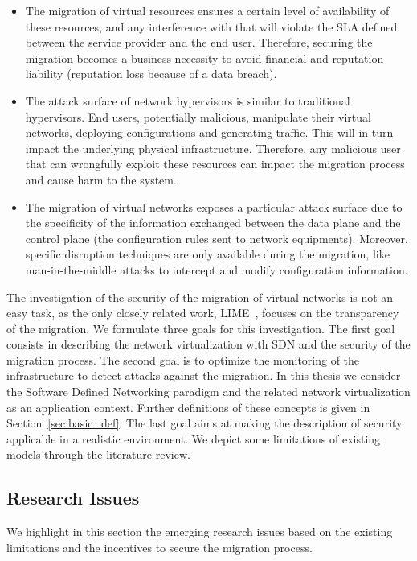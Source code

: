 \begin{itemize}
    
    \item The migration of virtual resources ensures a certain level of availability of these resources, and any interference with that will violate the SLA defined between the service provider and the end user.
    Therefore, securing the migration becomes a business necessity to avoid financial and reputation liability (\eg reputation loss because of a data breach).
    
    \item The attack surface of network hypervisors is similar to traditional hypervisors. End users, potentially malicious, manipulate their virtual networks, deploying configurations and generating traffic. This will in turn impact the underlying physical infrastructure. Therefore, any malicious user that can wrongfully exploit these resources can impact the migration process and cause harm to the system.

    \item The migration of virtual networks exposes a particular attack surface due to the specificity of the information exchanged between the data plane and the control plane (\eg the configuration rules sent to network equipments). Moreover, specific disruption techniques are only available during the migration, like man-in-the-middle attacks to intercept and modify configuration information.  
\end{itemize}

The investigation of the security of the migration of virtual networks is not an easy task, as the only closely related work, LIME~\cite{Lime-Ghorbani2014}, focuses on the transparency of the migration. 
We formulate three goals for this investigation.
The first goal consists in describing the network virtualization with SDN and the security of the migration process.
The second goal is to optimize the monitoring of the infrastructure to detect attacks against the migration. In this thesis we consider the Software Defined Networking paradigm and the related network virtualization as an application context. Further definitions of these concepts is given in Section~\ref{sec:basic_def}. 
The last goal aims at making the description of security applicable in a realistic environment.
We depict some limitations of existing models through the literature review.


\subsection{Research Issues}
We highlight in this section the emerging research issues based on the existing limitations and the incentives to secure the migration process.

